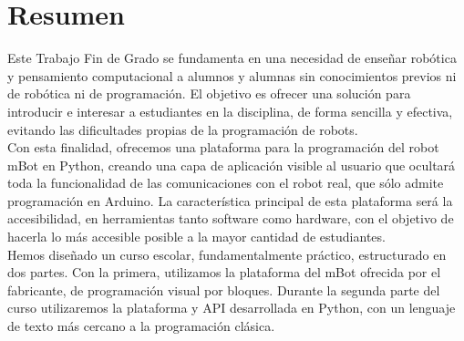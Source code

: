 
\chapter*{Resumen}


\label{cap:resumen}

Este Trabajo Fin de Grado se fundamenta en una necesidad de enseñar robótica y pensamiento computacional a alumnos y alumnas sin conocimientos previos ni de robótica ni de programación. El objetivo es ofrecer una solución para introducir e interesar a estudiantes en la disciplina, de forma sencilla y efectiva, evitando las dificultades propias de la programación de robots.\\

Con esta finalidad, ofrecemos una plataforma para la programación del robot mBot en Python, creando una capa de aplicación visible al usuario que ocultará toda la funcionalidad de las  comunicaciones con el robot real, que sólo admite programación en Arduino. La característica principal de esta plataforma será la accesibilidad, en herramientas tanto software como hardware, con el objetivo de hacerla lo más accesible posible a la mayor cantidad de estudiantes.\\

Hemos diseñado un curso escolar, fundamentalmente práctico, estructurado en dos partes. Con la primera, utilizamos la plataforma del mBot ofrecida por el fabricante, de programación visual por bloques. Durante la segunda parte del curso utilizaremos la plataforma y API desarrollada en Python, con un lenguaje de texto más cercano a la programación clásica.\\

\afterpage{\null\newpage}